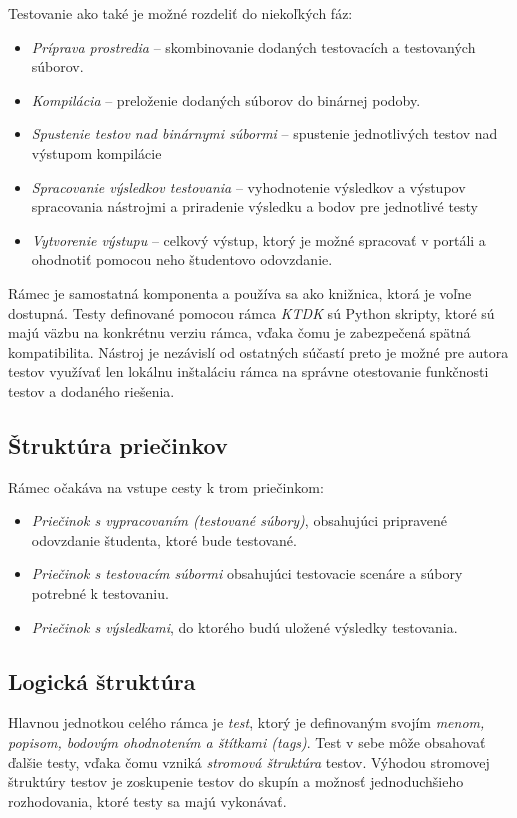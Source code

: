 \documentclass[
  digital, %
  twoside, %
  table,   %
  lof,     %
  lot,     %
]{fithesis3}
\begin{document}
Testovanie ako také je možné rozdeliť do niekoľkých fáz:
\begin{itemize}
    \item \emph{Príprava prostredia} -- skombinovanie dodaných testovacích a testovaných súborov.
    \item \emph{Kompilácia} -- preloženie dodaných súborov do binárnej podoby.
    \item \emph{Spustenie testov nad binárnymi súbormi} -- spustenie jednotlivých testov nad výstupom kompilácie
    \item \emph{Spracovanie výsledkov testovania} -- vyhodnotenie výsledkov a výstupov spracovania nástrojmi a priradenie výsledku a  bodov pre jednotlivé testy
    \item \emph{Vytvorenie výstupu} -- celkový výstup, ktorý je možné spracovať v portáli a ohodnotiť pomocou neho študentovo odovzdanie.
\end{itemize}

Rámec je samostatná komponenta a používa sa ako knižnica, ktorá je voľne dostupná. Testy definované pomocou rámca \emph{KTDK} sú Python skripty, ktoré sú majú väzbu na konkrétnu verziu rámca, vďaka čomu je zabezpečená spätná kompatibilita. Nástroj je nezávislí od ostatných súčastí preto je možné pre autora testov využívať len lokálnu inštaláciu rámca na správne otestovanie funkčnosti testov a dodaného riešenia.  

\subsection{Štruktúra priečinkov}

Rámec očakáva na vstupe cesty k trom priečinkom:
\begin{itemize}
    \item \emph{Priečinok s vypracovaním (testované súbory)}, obsahujúci pripravené odovzdanie študenta, ktoré bude testované.
    \item \emph{Priečinok s testovacím súbormi} obsahujúci testovacie scenáre a súbory potrebné k testovaniu.
    \item \emph{Priečinok s výsledkami}, do ktorého budú uložené výsledky testovania.
\end{itemize}


\subsection{Logická štruktúra}

Hlavnou jednotkou celého rámca je \emph{test}, ktorý je definovaným svojím \emph{menom, popisom, bodovým ohodnotením a štítkami (tags)}.
Test v sebe môže obsahovať ďalšie testy, vďaka čomu vzniká \emph{stromová štruktúra} testov. Výhodou stromovej štruktúry testov je zoskupenie testov do skupín a možnosť jednoduchšieho rozhodovania, ktoré testy sa majú vykonávať.
\end{document}
